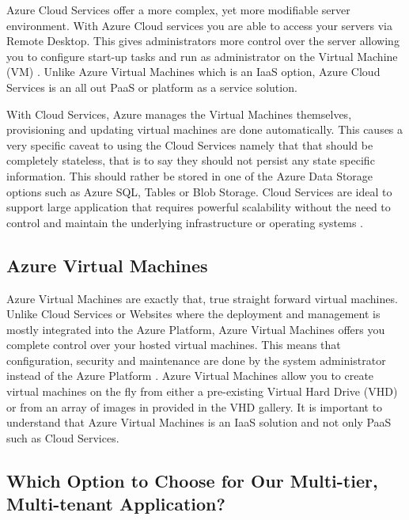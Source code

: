 Azure Cloud Services offer a more complex, yet more modifiable server environment. With Azure Cloud services you are able to access your servers via Remote Desktop. This gives administrators more control over the server allowing you to configure start-up tasks and run as administrator on the Virtual Machine (VM) \cite{Microsoft_Corporation2014-gg}. Unlike Azure Virtual Machines which is an IaaS option, Azure Cloud Services is an all out PaaS or platform as a service solution.
 
With Cloud Services, Azure manages the Virtual Machines themselves, provisioning and updating virtual machines are done automatically. This causes a very specific caveat to using the Cloud Services namely that that should be completely stateless, that is to say they should not persist any state specific information. This should rather be stored in one of the Azure Data Storage options such as Azure SQL, Tables or Blob Storage. Cloud Services are ideal to support large application that requires powerful scalability without the need to control and maintain the underlying infrastructure or operating systems \cite{Microsoft_Corporation_undated-ej}.

\subsection{Azure Virtual Machines}

Azure Virtual Machines are exactly that, true straight forward virtual machines. Unlike Cloud Services or Websites where the deployment and management is mostly integrated into the Azure Platform, Azure Virtual Machines offers you complete control over your hosted virtual machines. This means that configuration, security and maintenance are done by the system administrator instead of the Azure Platform \cite{Microsoft_Corporation2014-gg}. Azure Virtual Machines allow you to create virtual machines on the fly from either a pre-existing Virtual Hard Drive (VHD) or from an array of images in provided in the VHD gallery. It is important to understand that Azure Virtual Machines is an IaaS solution and not only PaaS such as Cloud Services.

\subsection{Which Option to Choose for Our Multi-tier, Multi-tenant Application?}

